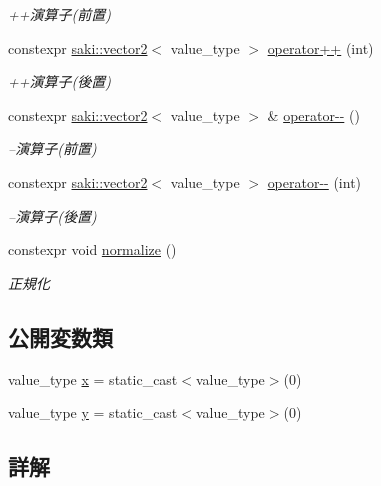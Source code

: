 \begin{DoxyCompactItemize}
\begin{DoxyCompactList}\small\item\em ++演算子(前置) \end{DoxyCompactList}\item 
constexpr \mbox{\hyperlink{classsaki_1_1vector2}{saki\+::vector2}}$<$ value\+\_\+type $>$ \mbox{\hyperlink{classsaki_1_1vector2_a04318d78cb10edb8a48d149254275a2b}{operator++}} (int)
\begin{DoxyCompactList}\small\item\em ++演算子(後置) \end{DoxyCompactList}\item 
constexpr \mbox{\hyperlink{classsaki_1_1vector2}{saki\+::vector2}}$<$ value\+\_\+type $>$ \& \mbox{\hyperlink{classsaki_1_1vector2_a89080c4aa884a4724db9a1a9928cf874}{operator-\/-\/}} ()
\begin{DoxyCompactList}\small\item\em --演算子(前置) \end{DoxyCompactList}\item 
constexpr \mbox{\hyperlink{classsaki_1_1vector2}{saki\+::vector2}}$<$ value\+\_\+type $>$ \mbox{\hyperlink{classsaki_1_1vector2_a22794cee08c50d6114ad4407c81b3d30}{operator-\/-\/}} (int)
\begin{DoxyCompactList}\small\item\em --演算子(後置) \end{DoxyCompactList}\item 
constexpr void \mbox{\hyperlink{classsaki_1_1vector2_a90907529f5891e7395e1253a95e7014d}{normalize}} ()
\begin{DoxyCompactList}\small\item\em 正規化 \end{DoxyCompactList}\end{DoxyCompactItemize}
\subsection*{公開変数類}
\begin{DoxyCompactItemize}
\item 
value\+\_\+type \mbox{\hyperlink{classsaki_1_1vector2_a8637207f0d001c6b44deb1834c29f5ad}{x}} = static\+\_\+cast$<$value\+\_\+type$>$(0)
\item 
value\+\_\+type \mbox{\hyperlink{classsaki_1_1vector2_a6275c229b3652cc2c4d88850507c5aea}{y}} = static\+\_\+cast$<$value\+\_\+type$>$(0)
\end{DoxyCompactItemize}


\subsection{詳解}
